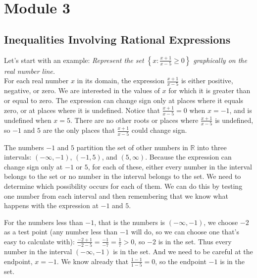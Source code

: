 \documentclass[11pt]{book}               %
\newtheorem{example}{Example}
\begin{document}
\label{third_module}
\chapter{Module 3}

\label{section_rational-inequalities}
\section{Inequalities Involving Rational Expressions}

 Let's start with an example: %
\emph{{Represent the set $\left\{x:\frac{x+1}{x-5} \geq 0\right\}$ graphically on the real number line.}}\\


For each real number $x$ in its domain, the expression $\frac{x+1}{x-5}$ is either positive, negative, or zero.
We are interested in the values of $x$ for which it is greater than or equal to zero.
The expression can change sign only at places where it equals zero, or at places where it is undefined.
Notice that $\frac{x+1}{x-5}=0$  when $x=-1$, and is undefined  when $x=5$. 
There are no other roots or places where $\frac{x+1}{x-5}$ is undefined, 
so $-1$ and $5$ are the only places that $\frac{x+1}{x-5}$ could change sign. 

The numbers $-1$ and $5$ partition the set of other numbers in $\mathbb{R}$ into three intervals: 
$(-\infty, -1)$, $(-1, 5)$, and $(5, \infty)$.  
Because the expression can change sign only at $-1$ or $5$, for each of these, either every number in the interval belongs to the set or no number in the interval belongs to the set.
We need to determine which possibility occurs for each of them.
We can do this by testing one number from each interval and then remembering that we know 
what happens with the expression at $-1$ and $5$.

For the numbers less than $-1$, that is the numbers is $(-\infty, -1)$, we choose $-2$ as a test point (any number less than $-1$ will do, so we can choose one that's easy to calculate with):
$\frac{-2+1}{-2-5}=\frac{-1}{-7}=\frac{1}{7}>0$, so $-2$ is in the set.  Thus every number in the interval $(-\infty, -1)$ is in the set.
And we need to be careful at the endpoint, $x = -1$.
We know already that $\frac{1-1}{1-5}=0$, so the endpoint $-1$ is in the set. 
\end{document}
